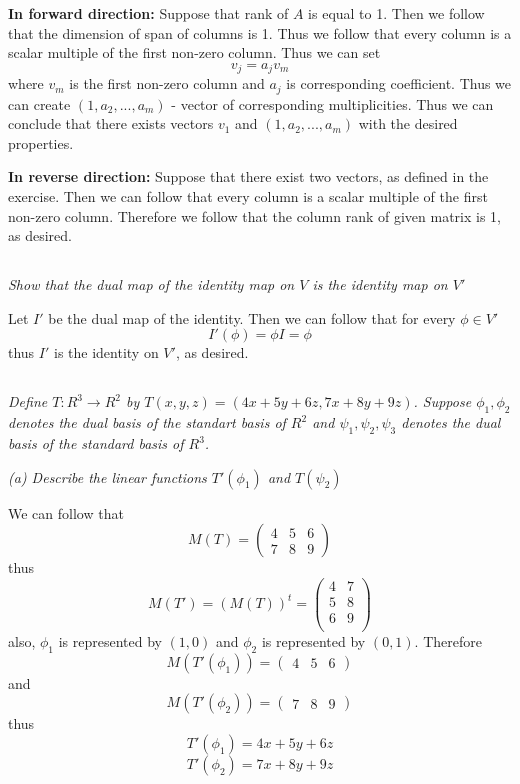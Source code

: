 \documentclass[11pt,oneside,titlepage]{book}
\begin{document}
\textbf{In forward direction: }
Suppose that rank of $A$ is equal to 1. Then we follow that the dimension of span of columns is 1.
Thus we follow that every column is a scalar multiple of the first non-zero column. Thus
we can set
$$v_j = a_j v_m$$
where $v_m$ is the first non-zero  column and $a_j$ is corresponding coefficient. Thus
we can create $(1, a_2, ..., a_m)$ - vector of corresponding multiplicities. Thus we can conclude
that there exists vectors $v_1$ and $(1, a_2, ..., a_m)$ with the desired properties.

\textbf{In reverse direction: }
Suppose that there exist two vectors, as defined in the exercise. Then we can follow that
every column is a scalar multiple of the first non-zero column. Therefore we follow that
the column rank of given matrix is 1, as desired.

\subsection{}

\textit{Show that the dual map of the identity map on $V$ is the identity map on $V'$}

Let $I'$ be the dual map of the identity. Then we can follow that for every $\phi \in V'$
$$I'(\phi) = \phi I = \phi$$
thus $I'$ is the identity on $V'$, as desired.

\subsection{}

\textit{Define $T: R^3 \to R^2$ by $T(x, y, z) = (4x + 5y + 6z, 7x + 8y + 9z)$. Suppose
  $\phi_1, \phi_2$ denotes the dual basis of the standart basis of $R^2$ and
  $\psi_1, \psi_2, \psi_3$ denotes the dual basis of the standard basis of $R^3$.}

\textit{(a) Describe the linear functions $T'(\phi_1)$ and $T(\psi_2)$}

We can follow that
$$M(T) = 
\begin{pmatrix}
  4 & 5 &  6 \\
  7 & 8 & 9
\end{pmatrix}
$$
thus 
$$M(T') = (M(T))^t = 
\begin{pmatrix}
  4 & 7 \\
  5 & 8 \\
  6 & 9 \\
\end{pmatrix}
$$
also, $\phi_1$ is represented by $(1, 0)$ and $\phi_2$ is represented by $(0, 1)$.
Therefore
$$M(T'(\phi_1)) =
\begin{pmatrix}
  4 &
  5 &
  6 
\end{pmatrix}
$$
and
$$M(T'(\phi_2)) =
\begin{pmatrix}
  7 &
  8 &
  9 
\end{pmatrix}
$$
thus
$$T'(\phi_1) = 4x + 5y + 6z$$
$$T'(\phi_2) = 7x + 8y + 9z$$
\end{document}
